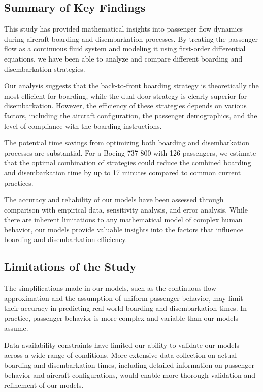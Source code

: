 \subsection{Summary of Key Findings}

This study has provided mathematical insights into passenger flow dynamics during aircraft boarding and disembarkation processes. By treating the passenger flow as a continuous fluid system and modeling it using first-order differential equations, we have been able to analyze and compare different boarding and disembarkation strategies.

Our analysis suggests that the back-to-front boarding strategy is theoretically the most efficient for boarding, while the dual-door strategy is clearly superior for disembarkation. However, the efficiency of these strategies depends on various factors, including the aircraft configuration, the passenger demographics, and the level of compliance with the boarding instructions.

The potential time savings from optimizing both boarding and disembarkation processes are substantial. For a Boeing 737-800 with 126 passengers, we estimate that the optimal combination of strategies could reduce the combined boarding and disembarkation time by up to 17 minutes compared to common current practices.

The accuracy and reliability of our models have been assessed through comparison with empirical data, sensitivity analysis, and error analysis. While there are inherent limitations to any mathematical model of complex human behavior, our models provide valuable insights into the factors that influence boarding and disembarkation efficiency.

\subsection{Limitations of the Study}

The simplifications made in our models, such as the continuous flow approximation and the assumption of uniform passenger behavior, may limit their accuracy in predicting real-world boarding and disembarkation times. In practice, passenger behavior is more complex and variable than our models assume.

Data availability constraints have limited our ability to validate our models across a wide range of conditions. More extensive data collection on actual boarding and disembarkation times, including detailed information on passenger behavior and aircraft configurations, would enable more thorough validation and refinement of our models.

